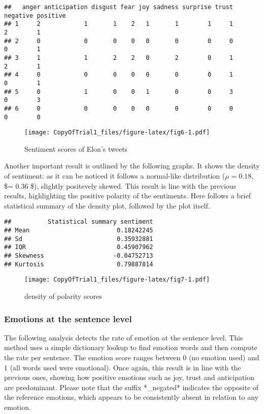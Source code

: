 \documentclass[
]{article}
\begin{document}
\begin{verbatim}
##   anger anticipation disgust fear joy sadness surprise trust negative positive
## 1     2            1       1    2   1       1        1     1        2        1
## 2     0            0       0    0   0       0        0     0        0        1
## 3     1            1       2    2   0       2        0     1        2        1
## 4     0            0       0    0   0       0        0     1        0        1
## 5     0            1       0    0   1       0        0     3        0        3
## 6     0            0       0    0   0       0        0     0        0        0
\end{verbatim}

\begin{figure}
\centering
\texttt{[image: CopyOfTrial1\_files/figure-latex/fig6-1.pdf]}
\caption{\label{fig:fig6}Sentiment scores of Elon's tweets}
\end{figure}

Another important result is outlined by the following graphs. It shows
the density of sentiment: as it can be noticed it follows a normal-like
distribution (\(\mu = 0.18\), \$\sigma = 0.36 \$), slightly positevely
skewed. This result is line with the previous results, highlighting the
positive polarity of the sentiments. Here follows a brief statistical
summary of the density plot, followed by the plot itself.

\begin{verbatim}
##          Statistical summary sentiment
## Mean                        0.18242245
## Sd                          0.35932881
## IQR                         0.45907962
## Skewness                   -0.04752713
## Kurtosis                    0.79887814
\end{verbatim}

\begin{figure}
\centering
\texttt{[image: CopyOfTrial1\_files/figure-latex/fig7-1.pdf]}
\caption{\label{fig:fig7}density of polarity scores}
\end{figure}

\hypertarget{emotions-at-the-sentence-level}{%
\subsubsection{Emotions at the sentence
level}\label{emotions-at-the-sentence-level}}

The following analysis detects the rate of emotion at the sentence
level. This method uses a simple dictionary lookup to find emotion words
and then compute the rate per sentence. The emotion score ranges between
0 (no emotion used) and 1 (all words used were emotional). Once again,
this result is in line with the previous ones, showing how positive
emotions such as joy, trust and anticipation are predominant. Please
note that the suffix *\_negated* indicates the opposite of the reference
emotions, which appears to be consistently absent in relation to any
emotion.
\end{document}
